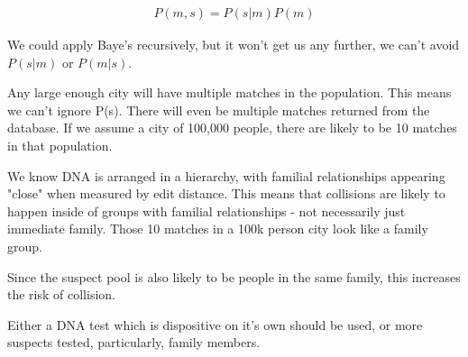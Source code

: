\documentclass{article}
\begin{document}
\begin{align}
	P(m,s) = P(s|m)P(m)
\end{align}

We could apply Baye's recursively, but it won't get us any further, we can't avoid $P(s|m)$ or $P(m|s)$.

Any large enough city will have multiple matches in the population. This means we can't ignore P(s). There will even be multiple matches returned from the database. If we assume a city of 100,000 people, there are likely to be 10 matches in that population.

We know DNA is arranged in a hierarchy, with familial relationships appearing "close" when measured by edit distance. This means that collisions are likely to happen inside of groups with familial relationships - not necessarily just immediate family. Those 10 matches in a 100k person city look like a family group.

Since the suspect pool is also likely to be people in the same family, this increases the risk of collision.

Either a DNA test which is dispositive on it's own should be used, or more suspects tested, particularly, family members.
\end{document}
